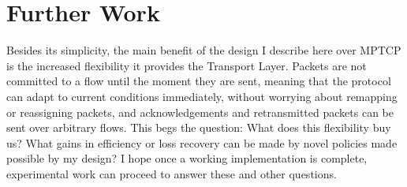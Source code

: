 \section{Further Work}
\label{sec:further}

Besides its simplicity, the main benefit of the design I describe here over MPTCP is the increased flexibility it provides the Transport Layer. Packets are not committed to a flow until the moment they are sent, meaning that the protocol can adapt to current conditions immediately, without worrying about remapping or reassigning packets, and acknowledgements and retransmitted packets can be sent over arbitrary flows. This begs the question: What does this flexibility buy us? What gains in efficiency or loss recovery can be made by novel policies made possible by my design? I hope once a working implementation is complete, experimental work can proceed to answer these and other questions.
